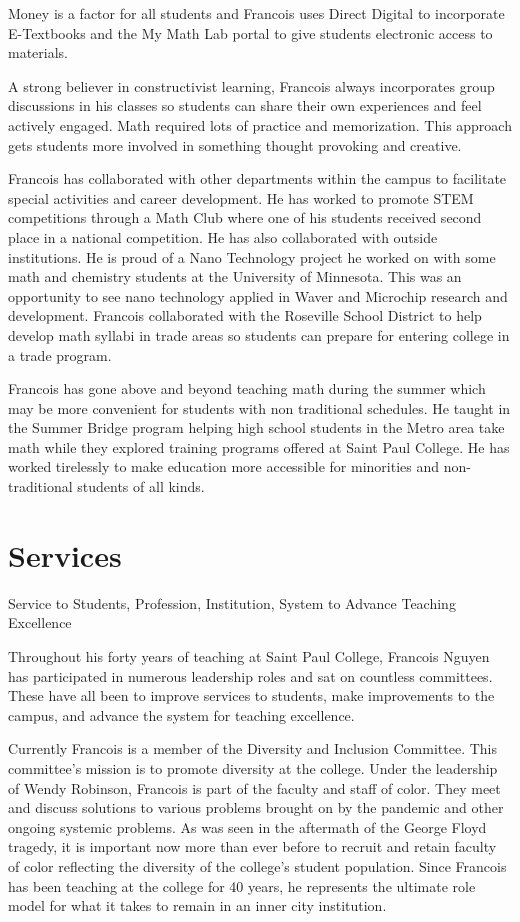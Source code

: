 \documentclass[
]{book}
\begin{document}
Money is a factor for all students and Francois uses Direct Digital to incorporate E-Textbooks and the My Math Lab portal to give students electronic access to materials.

A strong believer in constructivist learning, Francois always incorporates group discussions in his classes so students can share their own experiences and feel actively engaged. Math required lots of practice and memorization. This approach gets students more involved in something thought provoking and creative.

Francois has collaborated with other departments within the campus to facilitate special activities and career development. He has worked to promote STEM competitions through a Math Club where one of his students received second place in a national competition. He has also collaborated with outside institutions. He is proud of a Nano Technology project he worked on with some math and chemistry students at the University of Minnesota. This was an opportunity to see nano technology applied in Waver and Microchip research and development. Francois collaborated with the Roseville School District to help develop math syllabi in trade areas so students can prepare for entering college in a trade program.

Francois has gone above and beyond teaching math during the summer which may be more convenient for students with non traditional schedules. He taught in the Summer Bridge program helping high school students in the Metro area take math while they explored training programs offered at Saint Paul College. He has worked tirelessly to make education more accessible for minorities and non-traditional students of all kinds.

\chapter{Services}\label{services}

Service to Students, Profession, Institution, System to Advance Teaching Excellence

Throughout his forty years of teaching at Saint Paul College, Francois Nguyen has participated in numerous leadership roles and sat on countless committees. These have all been to improve services to students, make improvements to the campus, and advance the system for teaching excellence.

Currently Francois is a member of the Diversity and Inclusion Committee. This committee's mission is to promote diversity at the college. Under the leadership of Wendy Robinson, Francois is part of the faculty and staff of color. They meet and discuss solutions to various problems brought on by the pandemic and other ongoing systemic problems. As was seen in the aftermath of the George Floyd tragedy, it is important now more than ever before to recruit and retain faculty of color reflecting the diversity of the college's student population. Since Francois has been teaching at the college for 40 years, he represents the ultimate role model for what it takes to remain in an inner city institution.
\end{document}
